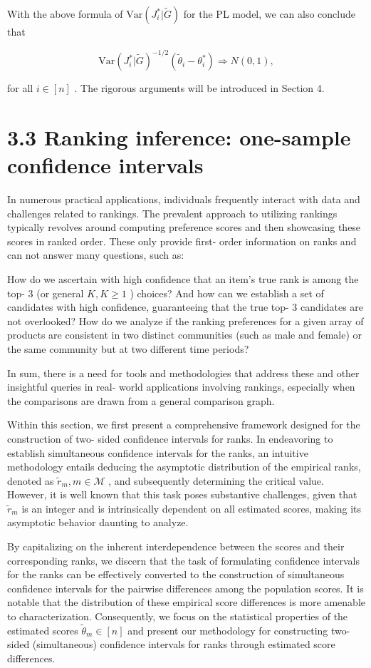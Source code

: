 With the above formula of \(\mathrm{Var}(J_i^* |\widetilde{G})\) for the
PL model, we can also conclude that

\[
\mathrm{Var}(J_i^* |\widetilde{G})^{-1 / 2}(\widetilde{\theta}_i - \theta_i^*)\Rightarrow N(0,1),
\]

for all \(i\in [n]\) . The rigorous arguments will be introduced in
Section 4.

\section{3.3 Ranking inference: one-sample confidence
intervals}\label{ranking-inference-one-sample-confidence-intervals}

In numerous practical applications, individuals frequently interact with
data and challenges related to rankings. The prevalent approach to
utilizing rankings typically revolves around computing preference scores
and then showcasing these scores in ranked order. These only provide
first- order information on ranks and can not answer many questions,
such as:

How do we ascertain with high confidence that an item's true rank is
among the top- 3 (or general \(K,K\geq 1\) ) choices? And how can we
establish a set of candidates with high confidence, guaranteeing that
the true top- 3 candidates are not overlooked? How do we analyze if the
ranking preferences for a given array of products are consistent in two
distinct communities (such as male and female) or the same community but
at two different time periods?

In sum, there is a need for tools and methodologies that address these
and other insightful queries in real- world applications involving
rankings, especially when the comparisons are drawn from a general
comparison graph.

Within this section, we first present a comprehensive framework designed
for the construction of two- sided confidence intervals for ranks. In
endeavoring to establish simultaneous confidence intervals for the
ranks, an intuitive methodology entails deducing the asymptotic
distribution of the empirical ranks, denoted as
\(\widetilde{r}_{m},m\in \mathcal{M}\) , and subsequently determining
the critical value. However, it is well known that this task poses
substantive challenges, given that \(\widetilde{r}_{m}\) is an integer
and is intrinsically dependent on all estimated scores, making its
asymptotic behavior daunting to analyze.

By capitalizing on the inherent interdependence between the scores and
their corresponding ranks, we discern that the task of formulating
confidence intervals for the ranks can be effectively converted to the
construction of simultaneous confidence intervals for the pairwise
differences among the population scores. It is notable that the
distribution of these empirical score differences is more amenable to
characterization. Consequently, we focus on the statistical properties
of the estimated scores \(\widetilde{\theta}_{m} \in [n]\) and present
our methodology for constructing two- sided (simultaneous) confidence
intervals for ranks through estimated score differences.

